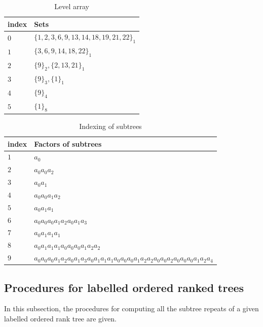 \documentclass[preprint,12pt]{elsarticle}
\begin{document}
	\begin{table}{
\begin{center}
			\begin{tabular}{|l|l|}\hline
                                 index & Sets\\  \hline
				   $0$ & $\{1,2,3,6,9,13,14,18,19,21,22\}_{1}$\\  
				   $1$ & $\{3,6,9,14,18,22\}_{1}$\\
				   $2$ & $\{9\}_{2},\{2,13,21\}_{1}$\\
				   $3$ & $\{9\}_{3},\{1\}_{1}$ \\
				   $4$ & $\{9\}_{4}$\\
				   $5$ & $\{1\}_{8}$\\\hline
			\end{tabular}
               \caption{Level array}
\end{center}

		}
		
	\end{table}
	\begin{table}{
\begin{center}
			\begin{tabular}{|l|l|}\hline
                                 index & Factors of subtrees\\  \hline
                                   $1$ & $a_{0}$\\ 
				   $2$ & $a_{0}a_{0}a_{2}$\\
				   $3$ & $a_{0}a_{1}$\\
				   $4$ & $a_{0}a_{0}a_{1}a_{2}$ \\
				   $5$ & $a_{0}a_{1}a_{1}$\\
				   $6$ & $a_{0}a_{0}a_{0}a_{1}a_{2}a_{0}a_{1}a_{3}$\\
				   $7$ & $a_{0}a_{1}a_{1}a_{1}$\\
				   $8$ & $a_{0}a_{1}a_{1}a_{1}a_{0}a_{0}a_{0}a_{1}a_{2}a_{2}$\\
				   $9$ & $a_{0}a_{0}a_{0}a_{1}a_{2}a_{0}a_{1}a_{3}a_{0}a_{1}a_{1}a_{1}a_{0}a_{0}a_{0}a_{1}a_{2}a_{2}a_{0}a_{0}a_{2}a_{0}a_{0}a_{0}a_{1}a_{2}a_{4}$\\ \hline
			\end{tabular}
               \caption{Indexing of subtrees}
\end{center}

		}
		
	\end{table}

\subsection{Procedures for labelled ordered ranked trees}
In this subsection, the procedures for computing all the subtree repeats of a given labelled ordered rank tree are given.
\end{document}
